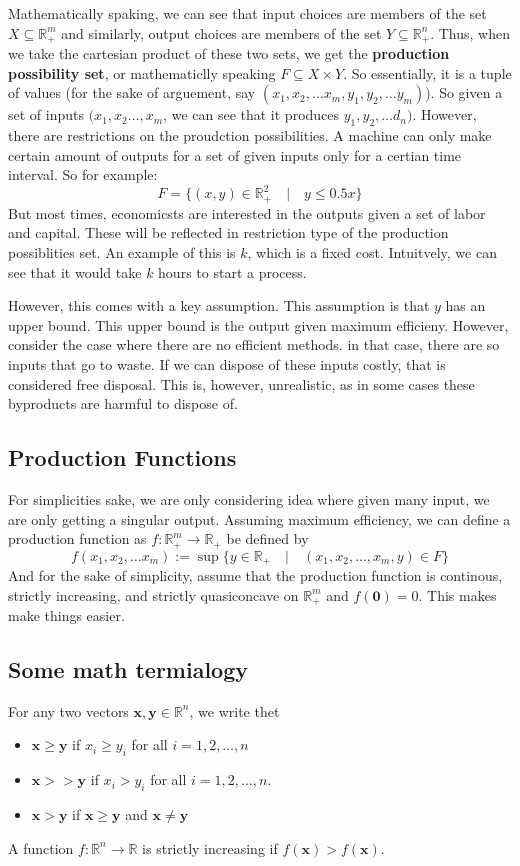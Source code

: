 \documentclass[12pt]{article}
\newcommand{\R}{\mathbb{R}}
\begin{document}
Mathematically spaking, we can see that input choices are members of the set $X \subseteq \mathbb{R}^m_+$ and similarly, output choices are members of the set $Y \subseteq \mathbb{R}^n_+$. Thus, when we take the cartesian product of these two sets, we get the \textbf{production possibility set}, or mathematiclly speaking $F \subseteq X \times Y$. So essentially, it is a tuple of values (for the sake of arguement, say $(x_1, x_2, \dots x_m, y_1, y_2, \dots y_m)$). So given a set of inputs $(x_1, x_2 \dots, x_m$, we can see that it produces $y_1, y_2, \dots d_n)$. However, there are restrictions on the proudction possibilities. A machine can only make certain amount of outputs for a set of given inputs only for a certian time interval. So for example:
\[
F = \{(x,y) \in \mathbb{R}^2_+ \quad | \quad y \leq 0.5x\}
\]
But most times, economicsts are interested in the outputs given a set of labor and capital. These will be reflected in restriction type of the production possiblities set. 
An example of this is $k$, which is a fixed cost. Intuitvely, we can see that it would take $k$ hours to start a process.


However, this comes with a key assumption. This assumption is that $y$ has an upper bound. This upper bound is the output given maximum efficieny. However, consider the case where there are no efficient methods. in that case, there are so inputs that go to waste. If we can dispose of these inputs costly, that is considered free disposal. This is, however, unrealistic, as in some cases these byproducts are harmful to dispose of. 
\subsection{Production Functions}
For simplicities sake, we are only considering idea where given many input, we are only getting a singular output. Assuming maximum efficiency, we can define a production function as $f: \R^m_+ \to \R_+$ be defined by
\[
f(x_1, x_2, \dots x_m) := \sup \{y \in \R_+ \quad | \quad (x_1, x_2, \dots, x_m, y )\in F \}
\]
And for the sake of simplicity, assume that the production function is continous, strictly increasing, and strictly quasiconcave on $\R_+^m$ and $f(\mathbf{0}) = 0$. This makes make things easier.  
\subsection{Some math termialogy}
For any two vectors $\mathbf{x}, \mathbf{y} \in \R^n$, we write thet 
\begin{itemize}
    \item $\mathbf{x} \geq \mathbf{y}$ if $x_i \geq y_i$ for all $i = 1,2, \dots, n$
    \item $\mathbf{x} >> \mathbf{y}$ if $x_i > y_i$ for all $i = 1, 2, \dots, n$. 
    \item $\mathbf{x} > \mathbf{y}$ if $\mathbf{x} \geq \mathbf{y}$ and $\mathbf{x} \neq \mathbf{y}$
\end{itemize}
A function $f: \R^n \to \R$ is strictly increasing if $f(\mathbf{x}) > f(\mathbf{x})$. 
\end{document}
